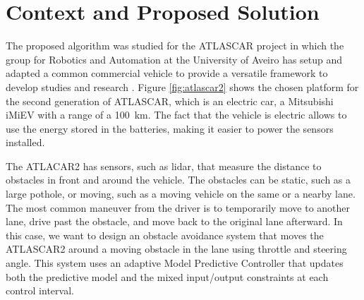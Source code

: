 \documentclass[conference,11pt]{IEEEtran}
\begin{document}
\section{Context and Proposed Solution}
The proposed algorithm was studied for the ATLASCAR project in which the group for Robotics and Automation at the University of Aveiro has setup and adapted a common commercial vehicle to provide a versatile  framework  to  develop  studies  and  research %
\cite{atlascar1} \cite{atlascar2}.
Figure \ref{fig:atlascar2} shows the chosen platform for the second generation of ATLASCAR, which is an electric car, a Mitsubishi iMiEV with a range of a \SI{100}{km}.
The fact that the vehicle is electric allows to use the energy stored in the batteries, making it easier to power the sensors installed.

The ATLACAR2 has sensors, such as lidar, that measure the distance to obstacles in front and around the vehicle. The obstacles can be static, such as a large pothole, or moving, such as a moving vehicle on the same or a nearby lane. The most common maneuver from the driver is to temporarily move to another lane, drive past the obstacle, and move back to the original lane afterward. In this case, we want to design an obstacle avoidance system that moves the ATLASCAR2 around a moving obstacle in the lane using throttle and steering angle. This system uses an adaptive Model Predictive Controller that updates both the predictive model and the mixed input/output constraints at each control interval.
\end{document}
